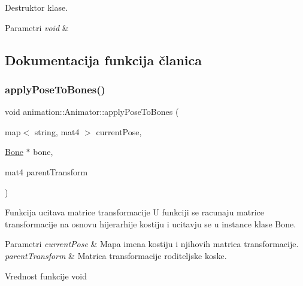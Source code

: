Destruktor klase. 


\begin{DoxyParams}{Parametri}
{\em void} & \\
\hline
\end{DoxyParams}


\subsection{Dokumentacija funkcija članica}
\mbox{\label{classanimation_1_1Animator_ad3a23a845327e2935845a8bfc1a934ce}} 
\subsubsection{\texorpdfstring{apply\+Pose\+To\+Bones()}{applyPoseToBones()}}
{\footnotesize\ttfamily void animation\+::\+Animator\+::apply\+Pose\+To\+Bones (\begin{DoxyParamCaption}\item[{map$<$ string, mat4 $>$}]{current\+Pose,  }\item[{\hyperlink{classmodel_1_1Bone}{Bone} $\ast$}]{bone,  }\item[{mat4}]{parent\+Transform }\end{DoxyParamCaption})\hspace{0.3cm}{\ttfamily [private]}}



Funkcija ucitava matrice transformacije U funkciji se racunaju matrice transformacije na osnovu hijerarhije kostiju i ucitavju se u instance klase Bone. 


\begin{DoxyParams}{Parametri}
{\em current\+Pose} & Mapa imena kostiju i njihovih matrica transformacije. \\
\hline
{\em parent\+Transform} & Matrica transformacije roditeljske koske. \\
\hline
\end{DoxyParams}
\begin{DoxyReturn}{Vrednost funkcije}
void 
\end{DoxyReturn}
\mbox{\label{classanimation_1_1Animator_af42f79e412ade4f598612b6301b06f9a}} 

